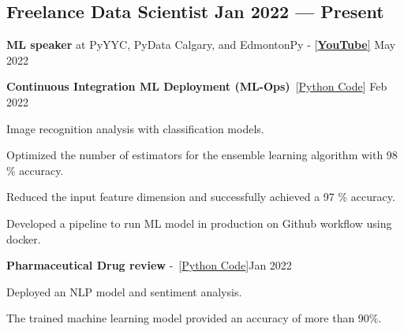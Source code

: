 \documentclass[letter,11pt]{article}
\begin{document}
\subsection{Freelance Data Scientist \hfill Jan 2022 --- Present}
\begin{zitemize}
	\item \textbf{ML speaker} at PyYYC, PyData Calgary, and EdmontonPy - [\href{https://www.youtube.com/watch?v=4S_QGDHTICw}{\textbf{YouTube}]} \hfill May 2022
	\item \textbf{Continuous Integration ML Deployment (ML-Ops)}~[\href{https://github.com/Hadi2525/ML_production_01/tree/Hadi2525-patch-1}{Python Code}] \hfill Feb 2022
	\begin{zitemize}
		\item Image recognition analysis with classification models.
		\item Optimized the number of estimators for the ensemble learning algorithm with 98 \% accuracy.
		\item Reduced the input feature dimension and successfully achieved a 97 \% accuracy.
		\item Developed a pipeline to run ML model in production on Github workflow using docker.
	\end{zitemize}
	\item \textbf{Pharmaceutical Drug review} -~[\href{https://github.com/Hadi2525/applied_ML/blob/master/Pharma/drug_model.ipynb}{Python Code}]\hfill Jan 2022
	\begin{zitemize}
		\item Deployed an NLP model and sentiment analysis.
		\item The trained machine learning model provided an accuracy of more than 90\%.
	\end{zitemize}

\end{zitemize}
\end{document}
